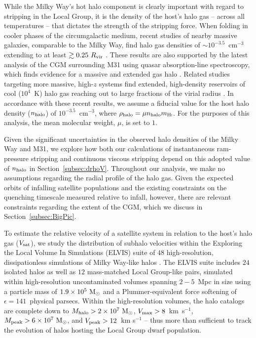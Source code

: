 \documentclass[usenatbib]{mn2e}
\newcommand{\msun}{{\rm M}_{\odot}}
\begin{document}
While the Milky Way's hot halo component is clearly important with
regard to stripping in the Local Group, it is the density
of the host's halo gas -- across all temperatures -- that dictates the
strength of the stripping force.
%
When folding in cooler phases of the circumgalactic medium, recent
studies of nearby massive galaxies, comparable to the Milky Way, find
halo gas densities of $\sim10^{-3.5}$~cm$^{-3}$ extending to
at least $\gtrsim0.25~R_{\rm vir}$ \citep{tumlinson13, werk14, fsm16}.
%
These results are also supported by the latest analysis of the CGM
surrounding M31 using quasar absorption-line spectroscopy, which finds
evidence for a massive and extended gas halo \citep{lehner15}.
%
Related studies targeting more massive, high-$z$ systems find
extended, high-density reservoirs of cool ($10^{4}$~K) halo gas
reaching out to large fractions of the virial radius \citep{lau15}.
%
In accordance with these recent results, we assume a fiducial value
for the host halo density ($n_{\rm halo}$) of $10^{-3.5}$~cm$^{-3}$,
where $\rho_{\rm halo} =\mu n_{\rm halo} m_{\rm H\scalebox{0.45}{\rm
    I}}$. For the purposes of this analysis, the mean molecular
weight, $\mu $, is set to $1$.


Given the significant uncertainties in the observed halo densities of
the Milky Way and M31, we explore how both our calculations of
instantaneous ram-pressure stripping and continuous viscous stripping
depend on this adopted value of
$n_{\rm halo}$ in Section~\ref{subsec:drhoV}.
%
Throughout our analysis, we make no assumptions regarding the radial
profile of the halo gas. 
%
Given the expected orbits of infalling satellite populations and the
existing constraints on the quenching timescale measured relative to
infall, however, there are relevant constraints regarding the extent
of the CGM, which we discuss in Section~\ref{subsec:BigPic}.
%




To estimate the relative velocity of a satellite system in relation to
the host's halo gas ($V_{\rm sat}$), we study the distribution of
subhalo velocities within the Exploring the Local Volume In
Simulations (ELVIS) suite of $48$ high-resolution, dissipationless
simulations of Milky Way-like halos \citep{gk14}.
%
The ELVIS suite includes $24$ isolated halos as well as $12$
mass-matched Local Group-like pairs, simulated within high-resolution
uncontaminated volumes spanning $2-5$~Mpc in size using a particle
mass of $1.9 \times 10^{5}~\msun$ and a Plummer-equivalent force
softening of $\epsilon = 141$~physical parsecs. Within the
high-resolution volumes, the halo catalogs are complete down to
$M_{\rm halo} > 2 \times 10^{7}~\msun$, $V_{\rm max} > 8$~km~s$^{-1}$,
$M_{\rm peak} > 6 \times 10^{7}~\msun$, and $V_{\rm peak} > 12$~km
s$^{-1}$ -- thus more than sufficient to track the evolution of halos
hosting the Local Group dwarf population.
%
\end{document}
